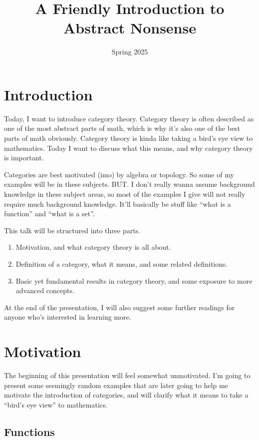 \documentclass[11pt, letterpaper]{article}
\title{A Friendly Introduction to Abstract Nonsense}
\date{Spring 2025}
\begin{document}
\maketitle
\tableofcontents
\newpage



\section{Introduction}

Today, I want to introduce category theory. Category theory is often described as one of the most abstract parts of math, which is why it's also one of the best parts of math obviously. Category theory is kinda like taking a bird's eye view to mathematics. Today I want to discuss what this means, and why category theory is important.

Categories are best motivated (imo) by algebra or topology. So some of my examples will be in these subjects. BUT. I don't really wanna assume background knowledge in these subject areas, so most of the examples I give will not really require much background knowledge. It'll basically be stuff like ``what is a function'' and ``what is a set''.

This talk will be structured into three parts.
\begin{enumerate}
	\item Motivation, and what category theory is all about.
	\item Definition of a category, what it means, and some related definitions.
	\item Basic yet fundamental results in category theory, and some exposure to more advanced concepts.
\end{enumerate}
At the end of the presentation, I will also suggest some further readings for anyone who's interested in learning more.



\section{Motivation}

The beginning of this presentation will feel somewhat unmotivated. I'm going to present some seemingly random examples that are later going to help me motivate the introduction of categories, and will clarify what it means to take a ``bird's eye view'' to mathematics.

\subsection{Functions}
\end{document}
